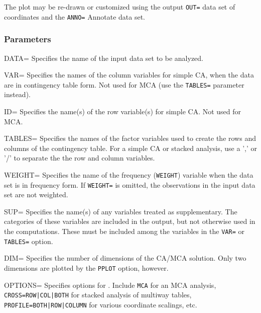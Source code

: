 The plot may be re-drawn or customized using the output \texttt{OUT=}
data set of coordinates and the \texttt{ANNO=} Annotate data set.

\subsubsection*{Parameters}%

\begin{proglist}

\item[DATA=]
Specifies the name of the input data set to be analyzed.

\item[VAR=]
Specifies the names of the column variables for simple
CA, when the data are in contingency table form.
Not used for MCA (use the \texttt{TABLES=} parameter instead).

\item[ID=]
Specifies the name(s) of the row variable(s) for simple
CA.  Not used for MCA.

\item[TABLES=]
Specifies the names of the factor variables used to create
the rows and columns of the contingency table.  For a simple
CA or stacked analysis, use a ',' or '/' to separate the
the row and column variables.

\item[WEIGHT=]
Specifies the name of the frequency (\texttt{WEIGHT}) variable when
the data set is in frequency form.  If \texttt{WEIGHT=} is omitted,
the observations in the input data set are not weighted.

\item[SUP=]
Specifies the name(s) of any variables treated as supplementary.
The categories of these variables are included in the output,
but not otherwise used in the computations.  
These must be included among the variables in the \texttt{VAR=} or
\texttt{TABLES=} option.  

\item[DIM=]
Specifies the number of dimensions of the CA/MCA solution.
Only two dimensions are plotted by the \texttt{PPLOT} option,
however.

\item[OPTIONS=]
Specifies options for .  Include \texttt{MCA} for an
MCA analysis, \texttt{CROSS=ROW|COL|BOTH} for stacked analysis of
multiway tables, \texttt{PROFILE=BOTH|ROW|COLUMN} for various
coordinate scalings, etc.  


\end{proglist}
